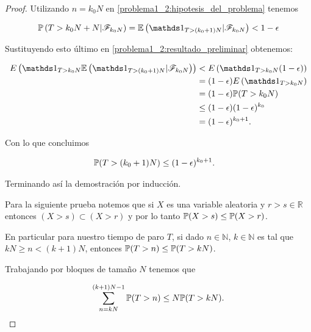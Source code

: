 \begin{proof}
	Utilizando  $n=k_0N$ en \eqref{problema1_2:hipotesis_del_problema} tenemos
    
	\begin{align}
		\mw\left(T>k_0N+N|\F_{k_0N}\right) = \E\left(\indic_{T>(k_0+1)N}|\F_{k_0N}\right) < 1-\epsilon
	\end{align}\pn
    
	Sustituyendo esto último en \eqref{problema1_2:resultado_preliminar} obtenemos:
    
    \begin{align}
             E\left(\indic_{T>k_0N} \E\left(\indic_{T>(k_0+1)N}|\F_{k_0N}\right)\right) 	&< 		E\left(\indic_{T>k_0N} (1-\epsilon)\right) \\
                                                                                            &=	 	(1-\epsilon) E\left(\indic_{T>k_0N} \right) \\
                                                                                            &=		(1-\epsilon) \mw(T>k_0N) \\
                                                                                            &\leq   (1-\epsilon)(1-\epsilon)^{k_0} \\
                                                                                            &= (1-\epsilon)^{k_0 + 1}.
    \end{align}\pn
        
	Con lo que concluimos
    
    \begin{align}
        \mathbb{P}(T>(k_0+1)N) &\leq (1-\epsilon)^{k_0 + 1}.
    \end{align}\pn
        
	Terminando así la demostración por inducción.\pn
	
	
	Para la siguiente prueba notemos que si $X$ es una variable aleatoria y $r > s \in \mathbb{R}$ entonces
	$(X > s) \subset (X > r)$ y por lo tanto $\mathbb{P}(X > s) \leq \mathbb{P}(X > r)$.\pn
	
	En particular para nuestro tiempo de paro $T$, si dado $n \in \mathbb{N}$, $k \in \mathbb{N}$ es tal que 
	$kN \geq n < (k+1)N$, entonces $\mathbb{P}(T > n) \leq \mathbb{P}(T > kN)$.\pn

	Trabajando por bloques de tamaño $N$ tenemos que 
    
	\begin{align}
		\sum_{n = kN}^{(k+1)N -1} \mathbb{P}(T > n) \leq N \mathbb{P}(T > kN).
	\end{align}\pn		
	

\end{proof}
